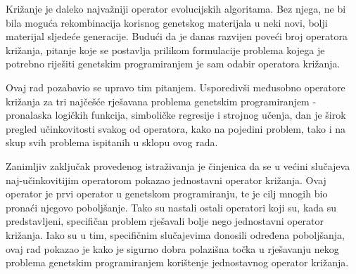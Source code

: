 Križanje je daleko najvažniji operator evolucijskih algoritama. Bez njega, ne bi bila moguća rekombinacija korisnog genetskog materijala u neki novi, bolji materijal sljedeće generacije. Budući da je danas razvijen poveći broj operatora križanja, pitanje koje se postavlja prilikom formulacije problema kojega je potrebno riješiti genetskim programiranjem je sam odabir operatora križanja. 

Ovaj rad pozabavio se upravo tim pitanjem. Usporedivši međusobno operatore križanja za tri najčešće rješavana problema genetskim programiranjem - pronalaska logičkih funkcija, simboličke regresije i strojnog učenja, dan je širok pregled učinkovitosti svakog od operatora, kako na pojedini problem, tako i na skup svih problema ispitanih u sklopu ovog rada. 

Zanimljiv zaključak provedenog istraživanja je činjenica da se u većini slučajeva naj-učinkovitijim operatorom pokazao jednostavni operator križanja. Ovaj operator je prvi operator u genetskom programiranju, te je cilj mnogih bio pronaći njegovo poboljšanje. Tako su nastali ostali operatori koji su, kada su predstavljeni, specifičan problem rješavali bolje nego jednostavni operator križanja. Iako su u tim, specifičnim slučajevima donosili određena poboljšanja, ovaj rad pokazao je kako je sigurno dobra polazišna točka u rješavanju nekog problema genetskim programiranjem korištenje jednostavnog operator križanja.